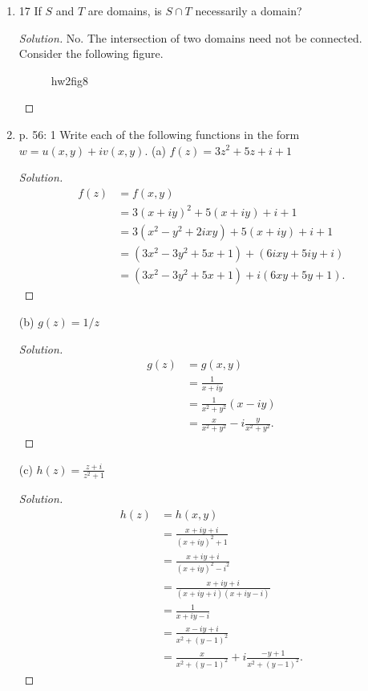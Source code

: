 \begin{enumerate}
\item 17 If $S$ and $T$ are domains, is $S \cap T$ necessarily a domain?
\begin{proof}[Solution]
	No. The intersection of two domains need not be connected. Consider the following figure.
\begin{figure}[ht]
    \centering
    \caption{hw2fig8}
    \label{fig:hw2fig8}
\end{figure}
\end{proof}
\item p. 56: 1 Write each of the following functions in the form $w=u(x, y)+i v(x, y)$.
(a) $f(z)=3 z^2+5 z+i+1$
\begin{proof}[Solution]
	\begin{align*}
		f(z) &= f(x,y) \\
		&= 3(x+iy)^2+5(x+iy)+i+1 \\
		&= 3(x^2-y^2+2ixy)+5(x+iy)+i+1 \\
		&= (3x^2-3y^2+5x+1)+(6ixy+5iy+i) \\
		&= (3x^2-3y^2+5x+1)+i(6xy+5y+1)
	.\end{align*}
	
\end{proof}

(b) $g(z)=1 / z$
\begin{proof}[Solution]
	\begin{align*}
		g(z) &= g(x,y) \\
		&= \frac{1}{x+iy} \\
		&= \frac{1}{x^2+y^2} \left( x-iy \right)  \\
		&= \frac{x}{x^2+y^2} -i \frac{y}{x^2+y^2}
	.\end{align*}
\end{proof}

(c) $h(z)=\frac{z+i}{z^2+1}$
\begin{proof}[Solution]
	\begin{align*}
		h(z)&= h(x,y) \\
		&= \frac{x+iy+i}{(x+iy)^2+1} \\
		&= \frac{x+iy+i}{(x+iy)^2- i^2} \\
		&= \frac{x+iy+i}{(x+iy+i)(x+iy-i)} \\
		&= \frac{1}{x+iy-i} \\
		&= \frac{x-iy+i}{x^2 + (y-1)^2} \\
		&= \frac{x}{x^2 + (y-1)^2} 
		+ i\frac{-y+1}{x^2 + (y-1)^2}
	.\end{align*}
\end{proof}


\end{enumerate}
